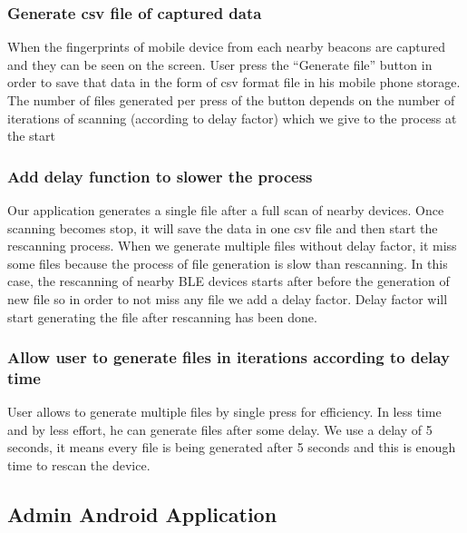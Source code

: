 \subsubsection{Generate csv file of captured data}
When the fingerprints of mobile device from each nearby beacons are captured and they can be seen on the screen. User press the “Generate file” button in order to save that data in the form of csv format file in his mobile phone storage. The number of files generated per press of the button depends on the number of iterations of scanning (according to delay factor) which we give to the process at the start
\subsubsection{Add delay function to slower the process}
Our application generates a single file after a full scan of nearby devices. Once scanning becomes stop, it will save the data in one csv file and then start the rescanning process. When we generate multiple files without delay factor, it miss some files because the process of file generation is slow than rescanning. In this case, the rescanning of nearby BLE devices starts after before the generation of new file so in order to not miss any file we add a delay factor. Delay factor will start generating the file after rescanning has been done.
\subsubsection{Allow user to generate files in iterations according to delay time}
User allows to generate multiple files by single press for efficiency. In less time and by less effort, he can generate files after some delay. We use a delay of 5 seconds, it means every file is being generated after 5 seconds and this is enough time to rescan the device.



\subsection{Admin Android Application}

